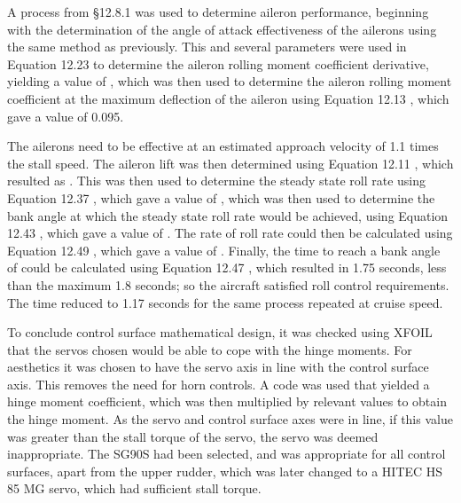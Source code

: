 \documentclass[../../main.tex]{subfiles}
\begin{document}
A process from \S 12.8.1 \cite{sadraey-13} was used to determine aileron performance, beginning with the determination of the angle of attack effectiveness of the ailerons using the same method as previously.
This and several parameters were used in Equation 12.23 \cite{sadraey-13} to determine the aileron rolling moment coefficient derivative, yielding a value of , which was then used to determine the aileron rolling moment coefficient at the maximum deflection of the aileron using Equation 12.13 \cite{sadraey-13}, which gave a value of 0.095. 

The ailerons need to be effective at an estimated approach velocity of 1.1 times the stall speed.
The aileron lift was then determined using Equation 12.11 \cite{sadraey-13}, which resulted as .
This was then used to determine the steady state roll rate using Equation 12.37 \cite{sadraey-13}, which gave a value of , which was then used to determine the bank angle at which the steady state roll rate would be achieved, using Equation 12.43 \cite{sadraey-13}, which gave a value of .
The rate of roll rate could then be calculated using Equation 12.49 \cite{sadraey-13}, which gave a value of .
Finally, the time to reach a bank angle of  could be calculated using Equation 12.47 \cite{sadraey-13}, which resulted in 1.75 seconds, less than the maximum 1.8 seconds; so the aircraft satisfied roll control requirements.
The time reduced to 1.17 seconds for the same process repeated at cruise speed. 

To conclude control surface mathematical design, it was checked using XFOIL that the servos chosen would be able to cope with the hinge moments.
For aesthetics it was chosen to have the servo axis in line with the control surface axis.
This removes the need for horn controls.
A code was used that yielded a hinge moment coefficient, which was then multiplied by relevant values to obtain the hinge moment.
As the servo and control surface axes were in line, if this value was greater than the stall torque of the servo, the servo was deemed inappropriate.
The SG90S had been selected, and was appropriate for all control surfaces, apart from the upper rudder, which was later changed to a HITEC HS 85 MG servo, which had sufficient stall torque. 

\end{document}
